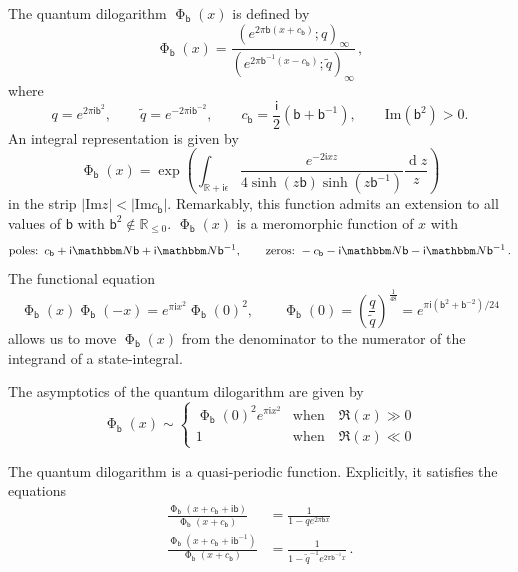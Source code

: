 \documentclass[12pt]{amsart}
\theoremstyle{definition}
\def\BN{\mathbbm N}
\def\tq{\tilde{q}}
\newcommand{\im}{\mathsf{i}}
\newcommand{\fad}[1]{\operatorname{\Phi}_{#1}}
\begin{document}
The quantum dilogarithm $\fad{\mathsf{b}}(x)$ is defined by 
\cite{Faddeev}
\begin{equation}\label{fad}
\fad{\mathsf{b}}(x)
=\frac{(e^{2 \pi \mathsf{b} (x+c_{\mathsf{b}})};q)_\infty}{
(e^{2 \pi \mathsf{b}^{-1} (x-c_{\mathsf{b}})};\tq)_\infty} \,,
\end{equation}
where
$$
q=e^{2 \pi \im \mathsf{b}^2}, \qquad 
\tq=e^{-2 \pi \im \mathsf{b}^{-2}}, \qquad
c_{\mathsf{b}}=\frac{\im}{2}(\mathsf{b}+\mathsf{b}^{-1}), \qquad 
\mathrm{Im}(\mathsf{b}^2) >0. 
$$
An integral representation is given by 
$$
\fad{\mathsf{b}}(x)=\exp\left( \int_{\mathbb{R}+\im\epsilon}
\frac{e^{-2\im xz}}{4\sinh(z\mathsf{b})\sinh(z\mathsf{b}^{-1})}
\frac{\operatorname{d}\!z}{z} \right)
$$
in the strip $|\mathrm{Im} z| < |\mathrm{Im} c_{\mathsf{b}}|$. 
Remarkably, this function admits 
an extension to all values of $\mathsf{b}$ with 
$\mathsf{b}^2\not\in\mathbb{R}_{\le 0}$. $\fad{\mathsf{b}}(x)$ is 
a meromorphic function of $x$ with
$$
\text{poles:} \,\,\, c_{\mathsf{b}} + \im \BN \mathsf{b} + \im \BN \mathsf{b}^{-1},
\qquad
\text{zeros:} \,\, -c_{\mathsf{b}} - \im \BN \mathsf{b} 
- \im\BN \mathsf{b}^{-1} \,.
$$ 
The functional equation
$$
\fad{\mathsf{b}}(x) \fad{\mathsf{b}}(-x)=e^{\pi \im x^2} \fad{\mathsf{b}}(0)^2, 
\qquad
\fad{\mathsf{b}}(0)=\left(\frac{q}{\tilde q}\right)^{\frac{1}{48}} 
=e^{\pi\im\left(\mathsf{b}^2+\mathsf{b}^{-2}\right)/24}
$$
allows us to move $\fad{\mathsf{b}}(x)$ from the denominator to the numerator
of the integrand of a state-integral. 


The asymptotics of the 
quantum dilogarithm are given by~\cite[App.A]{AK}
\begin{equation}
\label{eq.as}
\fad{\mathsf{b}}(x) \sim \begin{cases}
\fad{\mathsf{b}}(0)^2e^{\pi \im x^2} & \text{when} \quad \Re(x) \gg 0 \\
1             & \text{when} \quad \Re(x) \ll 0
\end{cases}
\end{equation}

The quantum dilogarithm is a quasi-periodic function. Explicitly,
it satisfies the equations
\begin{subequations}
\begin{align}
\label{eq.bshift}
\frac{\fad{\mathsf{b}}(x+c_{\mathsf{b}}+\im \mathsf{b})}{
\fad{\mathsf{b}}(x+c_{\mathsf{b}})} 
&= \frac{1}{1-q e^{2 \pi \mathsf{b} x}} 
\\ 
\label{eq.tbshift}
\frac{\fad{\mathsf{b}}(x+c_{\mathsf{b}}+\im\mathsf{b}^{-1})}{
\fad{\mathsf{b}}(x+c_{\mathsf{b}})} &= 
\frac{1}{1-\tq^{-1} e^{2 \pi \mathsf{b}^{-1} x}} \,.
\end{align}
\end{subequations}



%

\end{document}
